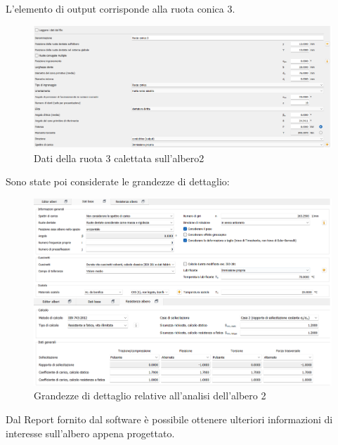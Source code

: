 L'elemento di output corrisponde alla ruota conica 3.
\begin{figure}[h]
    \centering
    \includegraphics[scale=0.45]{Immagini/Ruota3Albero2.png}
    \caption{Dati della ruota 3 calettata sull'albero2}
    \label{fig:Ruota3Albero2}
    \end{figure}
\newpage
Sono state poi considerate le grandezze di dettaglio:
\begin{figure}[h]
    \centering
    \includegraphics[scale=0.45]{Immagini/DettagliAlbero2.png}
    \caption{Grandezze di dettaglio relative all'analisi dell'albero 2}
    \label{fig:DettagliAlbero2}
\end{figure}

Dal Report fornito dal software è possibile ottenere ulteriori informazioni di interesse sull'albero appena progettato. 

